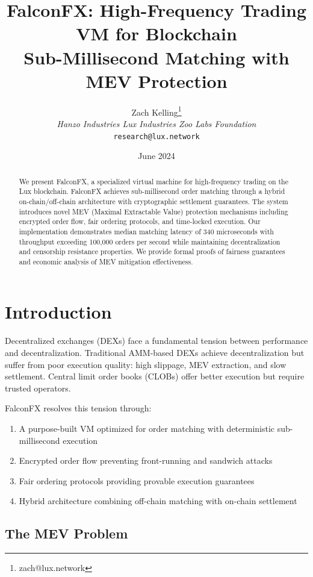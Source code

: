 \documentclass[11pt,a4paper]{article}
\title{FalconFX: High-Frequency Trading VM for Blockchain\\
\large Sub-Millisecond Matching with MEV Protection}
\author{Zach Kelling\thanks{zach@lux.network} \\ \textit{Hanzo Industries \quad Lux Industries \quad Zoo Labs Foundation} \\ \texttt{research@lux.network}}
\date{June 2024}
\begin{document}
\maketitle

\begin{abstract}
We present FalconFX, a specialized virtual machine for high-frequency trading on the Lux blockchain. FalconFX achieves sub-millisecond order matching through a hybrid on-chain/off-chain architecture with cryptographic settlement guarantees. The system introduces novel MEV (Maximal Extractable Value) protection mechanisms including encrypted order flow, fair ordering protocols, and time-locked execution. Our implementation demonstrates median matching latency of 340 microseconds with throughput exceeding 100,000 orders per second while maintaining decentralization and censorship resistance properties. We provide formal proofs of fairness guarantees and economic analysis of MEV mitigation effectiveness.
\end{abstract}

\section{Introduction}

Decentralized exchanges (DEXs) face a fundamental tension between performance and decentralization. Traditional AMM-based DEXs achieve decentralization but suffer from poor execution quality: high slippage, MEV extraction, and slow settlement. Central limit order books (CLOBs) offer better execution but require trusted operators.

FalconFX resolves this tension through:

\begin{enumerate}
    \item A purpose-built VM optimized for order matching with deterministic sub-millisecond execution
    \item Encrypted order flow preventing front-running and sandwich attacks
    \item Fair ordering protocols providing provable execution guarantees
    \item Hybrid architecture combining off-chain matching with on-chain settlement
\end{enumerate}

\subsection{The MEV Problem}
\end{document}
